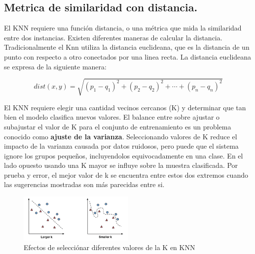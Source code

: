 \subsection{Metrica de similaridad con distancia.}

El KNN requiere una función distancia, o una métrica que mida la similaridad entre dos instancias. Existen diferentes maneras de calcular la distancia. Tradicionalmente el Knn utiliza la distancia euclideana, que es la distancia de un punto con respecto a otro conectados por una linea recta. La distancia euclideana se expresa de la siguiente manera:

\begin{equation}
dist(x,y) = \sqrt{(p_1-q_1)^2 + (p_2-q_2)^2+ \cdots + (p_n - q_n)^2}
\end{equation}

El KNN requiere elegir una cantidad  vecinos cercanos (K) y  determinar que tan bien el modelo clasifica nuevos valores. El balance entre sobre ajustar o subajustar el valor de K para el conjunto de entrenamiento es un problema conocido como \textbf{ajuste de la varianza}. Seleccionando valores de K reduce el impacto de la varianza causada por datos ruidosos, pero puede que el sistema ignore los grupos pequeños, incluyendolos equivocadamente en una clase. En el lado opuesto usando una K mayor se influye sobre la muestra clasificada. Por prueba y error, el mejor valor de k se encuentra entre estos dos extremos cuando las sugerencias mostradas son más parecidas entre si.


\begin{figure}[h]
\centering
\includegraphics[width=0.5\textwidth]{IMG_0061.png}
\caption{Efectos de selecciónar diferentes valores  de la K en KNN}
\end{figure}


